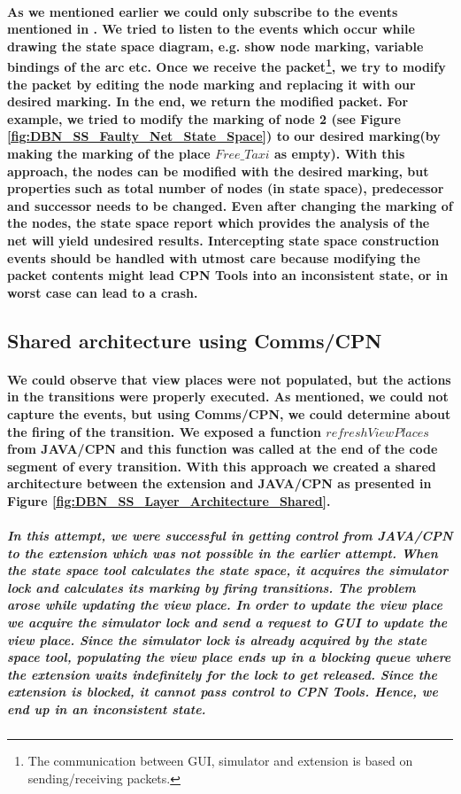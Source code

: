 \paragraph*{\textnormal{As we mentioned earlier we could only subscribe to the events mentioned in \cite{CPN_Tools_Message_State_Space}. We tried to listen to the events which occur while drawing the state space diagram, e.g. show node marking, variable bindings of the arc etc. Once we receive the packet\footnote{The communication between GUI, simulator and extension is based on sending/receiving packets.}, we try to modify the packet by editing the node marking and replacing it with our desired marking. In the end, we return the modified packet. For example, we tried to modify the marking of node 2 (see Figure \ref{fig:DBN_SS_Faulty_Net_State_Space}) to our desired marking(by making the marking of the place $\mathit{Free\_Taxi}$ as empty). With this approach, the nodes can be modified with the desired marking, but properties such as total number of nodes (in state space), predecessor and successor needs to be changed. Even after changing the marking of the nodes, the state space report which provides the analysis of the net will yield undesired results. Intercepting state space construction events should be handled with utmost care because modifying the packet contents might lead CPN Tools into an inconsistent state, or in worst case can lead to a crash.}}

\subsection*{Shared architecture using Comms/CPN}
\paragraph*{\textnormal{We could observe that view places were not populated, but the actions in the transitions were properly executed. As mentioned, we could not capture the events, but using Comms/CPN, we could determine about the firing of the transition. We exposed a function $\mathit{refreshViewPlaces}$ from JAVA/CPN and this function was called at the end of the code segment of every transition. With this approach we created a shared architecture between the extension and JAVA/CPN as presented in Figure \ref{fig:DBN_SS_Layer_Architecture_Shared}.}}

\subparagraph*{\textnormal{In this attempt, we were successful in getting control from JAVA/CPN to the extension which was not possible in the earlier attempt. When the state space tool calculates the state space, it acquires the simulator lock and calculates its marking by firing transitions. The problem arose while updating the view place. In order to update the view place we acquire the simulator lock and send a request to GUI to update the view place. Since the simulator lock is already acquired by the state space tool, populating the view place ends up in a blocking queue where the extension waits indefinitely for the lock to get released. Since the extension is blocked, it cannot pass control to CPN Tools. Hence, we end up in an inconsistent state.}}

